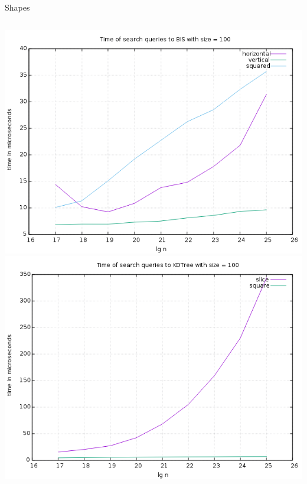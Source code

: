 \documentclass[pdf]{beamer}
\begin{document}
\begin{frame}{Shapes}
  \begin{columns}
    \includegraphics[scale=0.32]{pictures/analysis/smalls/all_100.png}
    \includegraphics[scale=0.32]{pictures/analysis/smalls/all_kdtree_100_2.png}
  \end{columns}
\end{frame}
\end{document}
